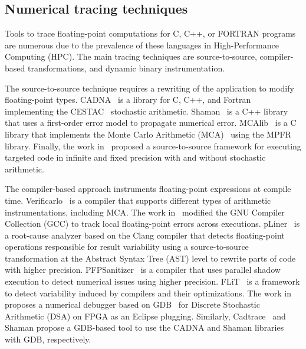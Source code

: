 \documentclass[11pt]{article}
\newcommand{\pytracer}[0]{PyTracer\xspace}
\begin{document}

\label{sec:soa}
\subsection{Numerical tracing techniques}
Tools to trace floating-point computations for C, C++, or FORTRAN programs are numerous due to the prevalence of these languages in High-Performance Computing (HPC). 
The main tracing techniques are source-to-source, compiler-based transformations, and dynamic binary instrumentation.

The source-to-source technique requires a rewriting of the application to modify floating-point types. 
CADNA~\cite{jezequel2008cadna} is a library for C, C++, and Fortran implementing the CESTAC~\cite{vignes1993stochastic} stochastic arithmetic. Shaman~\cite{demeure_phd} is a C++ library that uses a first-order error model to propagate numerical error. 
MCAlib~\cite{frechtling2015mcalib} is a C library that implements the Monte Carlo Arithmetic (MCA)~\cite{parker1997monte} using the MPFR~\cite{fousse2007mpfr} library.
Finally, the work in~\cite{tang2016software} proposed a source-to-source framework for executing targeted code in infinite and fixed precision with and without  stochastic arithmetic.

The compiler-based approach instruments floating-point expressions at compile time. 
Verificarlo~\cite{verificarlo} is a compiler that supports different types of arithmetic instrumentations, including MCA. 
The work in~\cite{bao2013fly} modified the GNU Compiler Collection (GCC) to track local floating-point errors across executions. pLiner~\cite{guo2020pliner} is a root-cause analyzer based on the Clang compiler that detects floating-point operations responsible for result variability using a source-to-source transformation at the Abstract Syntax Tree (AST) level to rewrite parts of code with higher precision. 
PFPSanitizer~\cite{chowdhary2020debugging,chowdhary2021parallel} is a compiler that uses parallel shadow execution to detect numerical issues using higher precision.
FLiT~\cite{sawaya2017flit} is a framework to detect variability induced by compilers and their optimizations.
The work in~\cite{wang2012development} proposes a numerical debugger based on GDB~\cite{stallman1988debugging} for Discrete Stochastic Arithmetic (DSA) on FPGA as an Eclipse plugging. Similarly, Cadtrace~\cite{jezequel2008cadna} and Shaman propose a GDB-based tool to use the CADNA and Shaman libraries with GDB, respectively.
\end{document}
